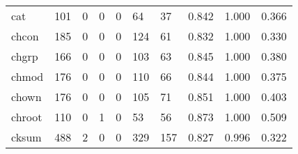 \begin{longtable}{lp{2.0cm}p{2.0cm}p{2.0cm}p{2.0cm}p{2.0cm}p{2.0cm}p{2.0cm}p{2.0cm}p{2.0cm}}
cat       &                    101 &                                             0 &                                            0 &                                           0 &                                           64 &                                         37 &                                0.842 &                                  1.000 &                                0.366 \\
chcon     &                    185 &                                             0 &                                            0 &                                           0 &                                          124 &                                         61 &                                0.832 &                                  1.000 &                                0.330 \\
chgrp     &                    166 &                                             0 &                                            0 &                                           0 &                                          103 &                                         63 &                                0.845 &                                  1.000 &                                0.380 \\
chmod     &                    176 &                                             0 &                                            0 &                                           0 &                                          110 &                                         66 &                                0.844 &                                  1.000 &                                0.375 \\
chown     &                    176 &                                             0 &                                            0 &                                           0 &                                          105 &                                         71 &                                0.851 &                                  1.000 &                                0.403 \\
chroot    &                    110 &                                             0 &                                            1 &                                           0 &                                           53 &                                         56 &                                0.873 &                                  1.000 &                                0.509 \\
cksum     &                    488 &                                             2 &                                            0 &                                           0 &                                          329 &                                        157 &                                0.827 &                                  0.996 &                                0.322 \\

\end{longtable}
